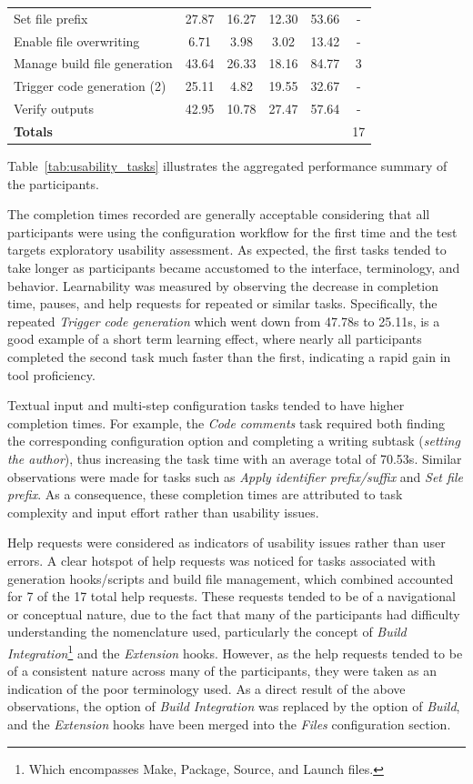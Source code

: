 \begin{table}[htbp]
\begin{tabular}{lccccc}
		Set file prefix 					& 27.87 & 16.27 & 12.30 & 53.66 & - \\
		Enable file overwriting 			& 6.71  & 3.98  & 3.02  & 13.42 & - \\
		Manage build file generation 		& 43.64 & 26.33 & 18.16 & 84.77 & 3 \\
		Trigger code generation (2)			& 25.11 & 4.82  & 19.55 & 32.67 & - \\
		Verify outputs 						& 42.95 & 10.78 & 27.47 & 57.64 & - \\
		\midrule
		\textbf{Totals} 					&  &  &  &  & 17 \\
		\bottomrule
	\end{tabular}
\end{table}

Table~\ref{tab:usability_tasks} illustrates the aggregated performance summary of the participants.

The completion times recorded are generally acceptable considering that all participants were using the configuration workflow for the first time and the test targets exploratory usability assessment. As expected, the first tasks tended to take longer as participants became accustomed to the interface, terminology, and behavior. Learnability was measured by observing the decrease in completion time, pauses, and help requests for repeated or similar tasks. Specifically, the repeated \textit{Trigger code generation} which went down from 47.78s to 25.11s, is a good example of a short term learning effect, where nearly all participants completed the second task much faster than the first, indicating a rapid gain in tool proficiency.

Textual input and multi-step configuration tasks tended to have higher completion times. For example, the \textit{Code comments} task required both finding the corresponding configuration option and completing a writing subtask (\textit{setting the author}), thus increasing the task time with an average total of 70.53s. Similar observations were made for tasks such as \textit{Apply identifier prefix/suffix} and \textit{Set file prefix}. As a consequence, these completion times are attributed to task complexity and input effort rather than usability issues.

Help requests were considered as indicators of usability issues rather than user errors. A clear hotspot of help requests was noticed for tasks associated with generation hooks/scripts and build file management, which combined accounted for 7 of the 17 total help requests. These requests tended to be of a navigational or conceptual nature, due to the fact that many of the participants had difficulty understanding the nomenclature used, particularly the concept of \textit{Build Integration}\footnote{Which encompasses Make, Package, Source, and Launch files.} and the \textit{Extension} hooks. However, as the help requests tended to be of a consistent nature across many of the participants, they were taken as an indication of the poor terminology used. As a direct result of the above observations, the option of \textit{Build Integration} was replaced by the option of \textit{Build}, and the \textit{Extension} hooks have been merged into the \textit{Files} configuration section.

